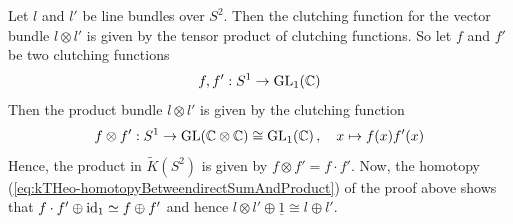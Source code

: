 \begin{example}\label{ex:kTheo-LineBundlesSatlquadequalslPlusl}
	Let $l$ and $l'$ be line bundles over $S^2$. Then the clutching function for the vector bundle $l\otimes l'$ is given by the tensor product of clutching functions. So let $f$ and $f'$ be two clutching functions
	\begin{equation*}
		f,f':S^1 \to 	  \mathrm{GL}_1(\mathbb{C})
	\end{equation*} Then the product bundle $l\otimes l'$ is given by the clutching function 
	\begin{equation*}
		f\otimes f': S^1\to \mathrm{GL}(\mathbb{C}\otimes \mathbb{C})\cong \mathrm{GL}_1(\mathbb{C})\,,\quad x\mapsto f(x)f'(x)
		\end{equation*}
	Hence, the product in $\tilde{K}(S^2)$ is given by  $f\otimes f'=f\cdot f'$.
	Now, the homotopy (\ref{eq:kTHeo-homotopyBetweendirectSumAndProduct}) of the proof above shows that 
$f\cdot f'\oplus \operatorname{\mathrm{id}}_1\simeq f \oplus f'$ and hence $l\otimes l'\oplus \underline{1}\cong l\oplus l'$.
\end{example}

